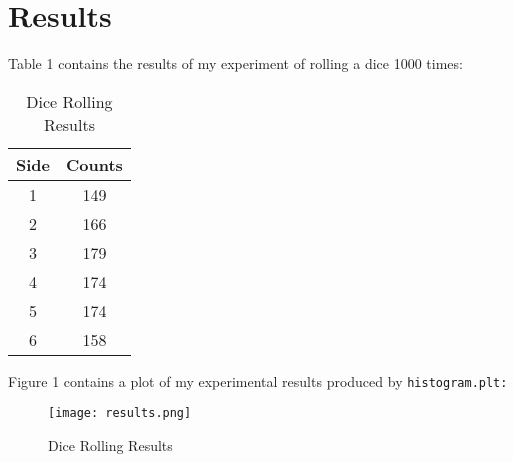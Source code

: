 \documentclass[letterpaper]{article}
\begin{document}

\section*{Results}

Table 1 contains the results of my experiment of rolling a dice 1000 times: 

\begin{table}[h!]
    \centering 
    \begin{tabular}{c||c}
    Side & Counts\\
    \hline
    1 & 149\\
    2 & 166\\
    3 & 179\\
    4 & 174\\
    5 & 174\\
    6 & 158\\
    \end{tabular}
    \caption{Dice Rolling Results}
    \label{tbl:rolls}
\end{table}

Figure 1 contains a plot of my experimental results produced by \verb|histogram.plt:|

\begin{figure}[h!]
\centering
\texttt{[image: results.png]}
\caption{Dice Rolling Results}
\label{fig:histogram}
\end{figure}
\end{document}
